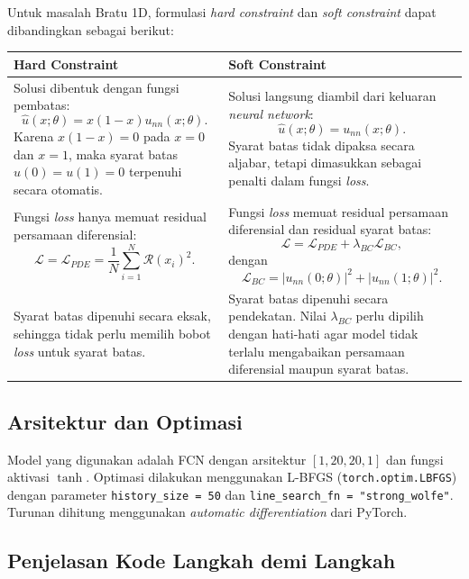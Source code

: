 \documentclass[12pt, letterpaper]{article}
\begin{document}
Untuk masalah Bratu 1D, formulasi \textit{hard constraint} dan
\textit{soft constraint} dapat dibandingkan sebagai berikut:

\begin{center}
\begin{tabular}{|p{}|p{}|}
\hline
\textbf{Hard Constraint} & \textbf{Soft Constraint} \\
\hline
Solusi dibentuk dengan fungsi pembatas:
\[
    \hat{u}(x;\theta) = x(1-x)u_{nn}(x;\theta).
\]
Karena $x(1-x)=0$ pada $x=0$ dan $x=1$, maka syarat batas
$u(0)=u(1)=0$ terpenuhi secara otomatis.
&
Solusi langsung diambil dari keluaran \textit{neural network}:
\[
    \hat{u}(x;\theta) = u_{nn}(x;\theta).
\]
Syarat batas tidak dipaksa secara aljabar, tetapi dimasukkan sebagai penalti
dalam fungsi \textit{loss}.
\\
\hline
Fungsi \textit{loss} hanya memuat residual persamaan diferensial:
\[
    \mathcal{L}
    =
    \mathcal{L}_{PDE}
    =
    \frac{1}{N}\sum_{i=1}^{N}\mathcal{R}(x_i)^2.
\]
&
Fungsi \textit{loss} memuat residual persamaan diferensial dan residual syarat batas:
\[
    \mathcal{L}
    =
    \mathcal{L}_{PDE}
    +
    \lambda_{BC}\mathcal{L}_{BC},
\]
dengan
\[
    \mathcal{L}_{BC}
    =
    |u_{nn}(0;\theta)|^2
    +
    |u_{nn}(1;\theta)|^2.
\]
\\
\hline
Syarat batas dipenuhi secara eksak, sehingga tidak perlu memilih bobot
\textit{loss} untuk syarat batas.
&
Syarat batas dipenuhi secara pendekatan. Nilai $\lambda_{BC}$ perlu dipilih
dengan hati-hati agar model tidak terlalu mengabaikan persamaan diferensial maupun syarat batas.
\\
\hline
\end{tabular}
\end{center}

\subsection{Arsitektur dan Optimasi}

Model yang digunakan adalah FCN dengan arsitektur $[1, 20, 20, 1]$ dan
fungsi aktivasi $\tanh$. Optimasi dilakukan menggunakan L-BFGS (\texttt{torch.optim.LBFGS})
dengan parameter \texttt{history\_size = 50} dan \texttt{line\_search\_fn = "strong\_wolfe"}.
Turunan dihitung menggunakan \textit{automatic differentiation} dari PyTorch.

\subsection{Penjelasan Kode Langkah demi Langkah}
\end{document}
